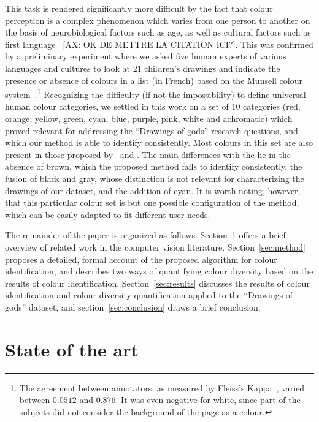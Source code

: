 \documentclass[11pt,a4paper]{article}
\begin{document}
This task is rendered significantly more difficult by the fact that colour perception is a complex phenomenon which varies from one person to another on the basis of neurobiological factors such as age, as well as cultural factors such as first language~\cite[][pp. 35 and 87]{pastoureau2017} {\color{red}[AX: OK DE METTRE LA CITATION ICI?]}. This was confirmed by a preliminary experiment where we asked five human experts of various languages and cultures to look at 21 children's drawings and indicate the presence or absence of colours in a list (in French) based on the Munsell colour system~\cite{Munsell1912}.\footnote{The agreement between annotators, as measured by Fleiss's Kappa~\cite{Fleiss1971}, varied between $0.0512$ and $0.876$. It was even negative for white, since part of the subjects did not consider the background of the page as a colour.} Recognizing the difficulty (if not the impossibility) to define universal human colour categories, we settled in this work on a set of 10 categories (red, orange, yellow, green, cyan, blue, purple, pink, white and achromatic) which proved relevant for addressing the ``Drawings of gods'' research questions, and which our method is able to identify consistently. Most colours in this set are also present in those proposed by~\citet{berlinkay1969} and \citet{pastoureau2017}. The main differences with the lie in the absence of brown, which the proposed method fails to identify consistently, the fusion of black and gray, whose distinction is not relevant for characterizing the drawings of our dataset, and the addition of cyan. It is worth noting, however, that this particular colour set is but one possible configuration of the method, which can be easily adapted to fit different user needs.

The remainder of the paper is organized as follows. Section~\ref{sec:state_of_the_art} offers a brief overview of related work in the computer vision literature. Section~\ref{sec:method} proposes a detailed, formal account of the proposed algorithm for colour identification, and describes two ways of quantifying colour diversity based on the results of colour identification. Section~\ref{sec:results} discusses the results of colour identification and colour diversity quantification applied to the ``Drawings of gods'' dataset, and section~\ref{sec:conclusion} draws a brief conclusion.


\section{State of the art}
\label{sec:state_of_the_art}
\end{document}
